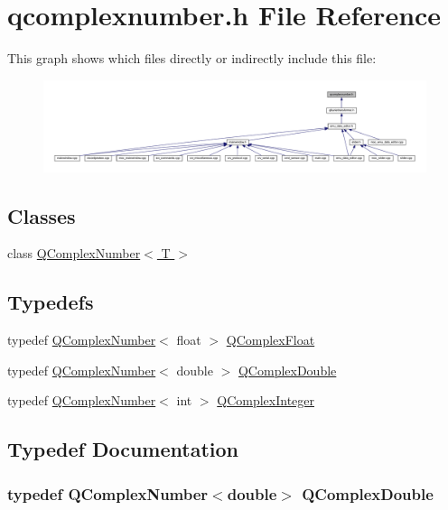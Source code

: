 \hypertarget{a00114}{\section{qcomplexnumber.\+h File Reference}
\label{a00114}
}
This graph shows which files directly or indirectly include this file\+:
\nopagebreak
\begin{figure}[H]
\begin{center}
\leavevmode
\includegraphics[width=350pt]{de/de9/a00322}
\end{center}
\end{figure}
\subsection*{Classes}
\begin{DoxyCompactItemize}
\item 
class \hyperlink{a00021}{Q\+Complex\+Number$<$ T $>$}
\end{DoxyCompactItemize}
\subsection*{Typedefs}
\begin{DoxyCompactItemize}
\item 
typedef \hyperlink{a00021}{Q\+Complex\+Number}$<$ float $>$ \hyperlink{a00114_ad957a9578f5201ba6cd85e0369965a0e}{Q\+Complex\+Float}
\item 
typedef \hyperlink{a00021}{Q\+Complex\+Number}$<$ double $>$ \hyperlink{a00114_a0b0c28ad9b49b8db131d1b7a83d88b90}{Q\+Complex\+Double}
\item 
typedef \hyperlink{a00021}{Q\+Complex\+Number}$<$ int $>$ \hyperlink{a00114_ae575bcbda7093edc173011db3fce5000}{Q\+Complex\+Integer}
\end{DoxyCompactItemize}


\subsection{Typedef Documentation}
\hypertarget{a00114_a0b0c28ad9b49b8db131d1b7a83d88b90}{
\subsubsection[{Q\+Complex\+Double}]{\setlength{\rightskip}{0pt plus 5cm}typedef {\bf Q\+Complex\+Number}$<$double$>$ {\bf Q\+Complex\+Double}}}\label{a00114_a0b0c28ad9b49b8db131d1b7a83d88b90}


